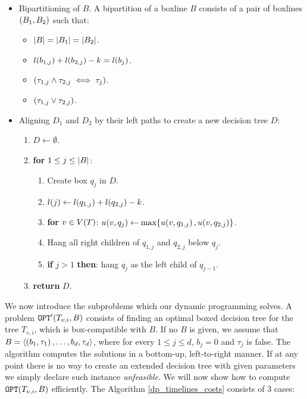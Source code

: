 \begin{itemize}
    \item Bipartitioning of $B$. A bipartition of a boxline $B$ consists of a pair of boxlines $\mathopen{}\left( B_1,B_2 \right)$ such that:
    \begin{itemize}
        \item $\mathopen{}\left| B \right|=\mathopen{}\left| B_1 \right|=\mathopen{}\left| B_2 \right|$.
        \item $l\mathopen{}\left( b_{1,j} \right)+l\mathopen{}\left( b_{2,j} \right) - k = l\mathopen{}\left( b_j \right)$.
        \item $\mathopen{}\left( \tau_{1,j}\land \tau_{2,j} \iff \tau_{j} \right)$.
        \item$\mathopen{}\left( \tau_{1,j}\lor \tau_{2,j} \right)$.
    \end{itemize} 
    \item Aligning $D_1$ and $D_2$ by their left paths to create a new decision tree $D$: 
    \begin{enumerate}
        \item $D\gets\emptyset$.
        \item \textbf{for} $1\leq j\leq \mathopen{}\left| B \right|$:
        \begin{enumerate}
            \item Create box $q_j$ in $D$.
            \item $l\mathopen{}\left( j \right)\gets l\mathopen{}\left( q_{1,j} \right)+ l\mathopen{}\left( q_{2,j} \right)-k$.
            \item \textbf{for} $v\in V\mathopen{}\left( T \right)$: $u\mathopen{}\left( v, q_j \right)\gets \max\mathopen{}\left\{ u\mathopen{}\left( v, q_{1,j} \right),u\mathopen{}\left( v, q_{2,j} \right) \right\}$.
            \item Hang all right children of $q_{1,j}$ and $q_{2,j}$ below $q_j$.
            \item \textbf{if} $j>1$ \textbf{then}: hang $q_j$ as the left child of $q_{j-1}$.
        \end{enumerate}
        \item \textbf{return} $D$.
    \end{enumerate}
\end{itemize}

We now introduce the subproblems which our dynamic programming solves. A problem $\texttt{OPT}'\mathopen{}\left( T_{v,i},B \right)$ consists of finding an optimal boxed decision tree for the tree $T_{v,i}$, which is box-compatible with $B$. If no $B$ is given, we assume that $B=\mathopen{}\langle \mathopen{}\left( b_1,\tau_1 \right),\dots, {b_d,\tau_d} \rangle$, where for every $1\leq j\leq d$, $b_j=0$ and $\tau_j$ is false.
 The algorithm computes the solutions in a bottom-up, left-to-right manner. If at any point there is no way to create an extended decision tree with given parameters we simply declare such instance \textit{unfeasible}. We will now show how to compute $\texttt{OPT}\mathopen{}\left( T_{v,i}, B \right)$ efficiently. The Algorithm \ref{dp_timelines_costs} consists of 3 cases:
 
